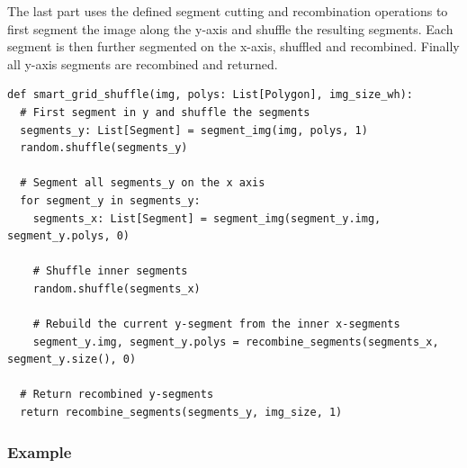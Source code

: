 \documentclass[10pt]{book}
\newenvironment{code}{\captionsetup{type=listing}}{}
\begin{document}
The last part uses the defined segment cutting and recombination operations to first segment the image along the y-axis and shuffle the resulting segments. Each segment is then further segmented on the x-axis, shuffled and recombined. Finally all y-axis segments are recombined and returned.

\begin{code}
\label{lst:sgs_main}
\begin{verbatim}
def smart_grid_shuffle(img, polys: List[Polygon], img_size_wh):
  # First segment in y and shuffle the segments
  segments_y: List[Segment] = segment_img(img, polys, 1)
  random.shuffle(segments_y)

  # Segment all segments_y on the x axis
  for segment_y in segments_y:
    segments_x: List[Segment] = segment_img(segment_y.img, segment_y.polys, 0)
    
    # Shuffle inner segments
    random.shuffle(segments_x)
    
    # Rebuild the current y-segment from the inner x-segments
    segment_y.img, segment_y.polys = recombine_segments(segments_x, segment_y.size(), 0)

  # Return recombined y-segments
  return recombine_segments(segments_y, img_size, 1)
\end{verbatim}
\end{code}

\subsubsection{Example}
\end{document}
